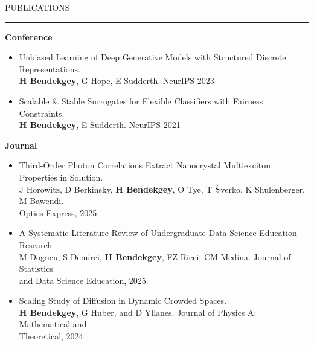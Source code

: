 \documentclass{resume} %
\renewenvironment{rSection}[1]{
\sectionskip
\textcolor{CarnegieMellonRed}{\MakeUppercase{#1}}
\sectionlineskip
\hrule
\begin{list}{}{
\setlength{\leftmargin}{1.5em}
}
\item[]
}{
\end{list}
}
\begin{document}
\begin{rSection}{Publications} \itemsep -2pt
{\bf Conference}
\begin{itemize}
	\item Unbiased Learning of Deep Generative Models with Structured Discrete
Representations.\\
		{\bf H Bendekgey}, G Hope, E Sudderth. NeurIPS 2023
	\item Scalable \& Stable Surrogates for Flexible Classifiers with Fairness Constraints.\\
		{\bf H Bendekgey}, E Sudderth. NeurIPS 2021
\end{itemize}
\vspace{1.0em}
{\bf Journal}
\begin{itemize}
	\item Third-Order Photon Correlations Extract Nanocrystal Multiexciton Properties in Solution.\\
        J Horowitz, D Berkinsky, {\bf H Bendekgey}, O Tye, T $\check{\textnormal{S}}$verko, K Shulenberger, M Bawendi.	 \\Optics Express, 2025.
	\item A Systematic Literature Review of Undergraduate Data Science Education Research\\
		M Dogucu, S Demirci, {\bf H Bendekgey}, FZ Ricci, CM Medina. Journal of Statistics\\ and Data Science Education, 2025.
	\item Scaling Study of Diffusion in Dynamic Crowded Spaces.\\
	      {\bf H Bendekgey}, G Huber, and D Yllanes. Journal of Physics A: Mathematical and \\ Theoretical, $2024$
\end{itemize}
\end{rSection}
\end{document}
